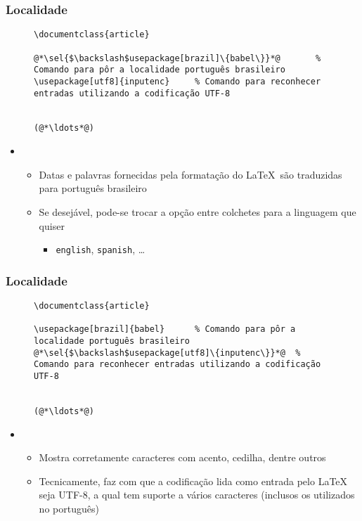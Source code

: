 \begin{frame}[fragile] \frametitle{Localidade}
\begin{figure}[!t]
\begin{lstlisting}
\documentclass{article}

@*\sel{$\backslash$usepackage[brazil]\{babel\}}*@		% Comando para pôr a localidade português brasileiro 
\usepackage[utf8]{inputenc} 	% Comando para reconhecer entradas utilizando a codificação UTF-8


(@*\ldots*@)
\end{lstlisting}
\end{figure}

\begin{itemize}
	\item {}
	\begin{itemize}
		\item Datas e palavras fornecidas pela formatação do LaTeX~são traduzidas para português brasileiro
		\item Se desejável, pode-se trocar a opção entre colchetes para a linguagem que quiser
		\begin{itemize}
			\item \texttt{english}, \texttt{spanish}, \ldots
		\end{itemize}
	\end{itemize}
\end{itemize}
\end{frame}

\begin{frame}[fragile] \frametitle{Localidade}
\begin{figure}[!t]
\begin{lstlisting}
\documentclass{article}

\usepackage[brazil]{babel}		% Comando para pôr a localidade português brasileiro
@*\sel{$\backslash$usepackage[utf8]\{inputenc\}}*@ 	% Comando para reconhecer entradas utilizando a codificação UTF-8


(@*\ldots*@)
\end{lstlisting}
\end{figure}

\begin{itemize}
	\item {}
	\begin{itemize}
		\item Mostra corretamente caracteres com acento, cedilha, dentre outros
		\item Tecnicamente, faz com que a codificação lida como entrada pelo LaTeX seja UTF-8, a qual tem suporte a vários caracteres (inclusos os utilizados no português)
	\end{itemize}
\end{itemize}
\end{frame}

